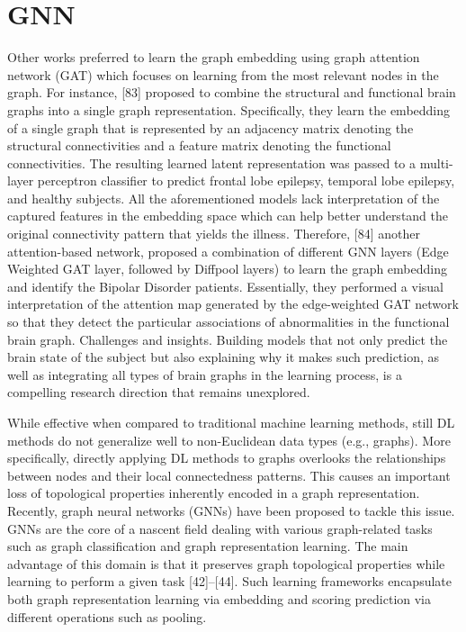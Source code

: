 \section{GNN}

Other
works preferred to learn the graph embedding using graph
attention network (GAT) which focuses on learning from
the most relevant nodes in the graph. For instance, [83]
proposed to combine the structural and functional brain
graphs into a single graph representation. Specifically, they
learn the embedding of a single graph that is represented by
an adjacency matrix denoting the structural connectivities
and a feature matrix denoting the functional connectivities.
The resulting learned latent representation was passed to
a multi-layer perceptron classifier to predict frontal lobe
epilepsy, temporal lobe epilepsy, and healthy subjects. All
the aforementioned models lack interpretation of the captured features in 
the embedding space which can help better
understand the original connectivity pattern that yields
the illness. Therefore, [84] another attention-based network,
proposed a combination of different GNN layers (Edge Weighted GAT layer, 
followed by Diffpool layers) to learn
the graph embedding and identify the Bipolar Disorder patients. Essentially, they performed a visual interpretation
of the attention map generated by the edge-weighted GAT
network so that they detect the particular associations of
abnormalities in the functional brain graph.
Challenges and insights. Building models that not only
predict the brain state of the subject but also explaining why
it makes such prediction, as well as integrating all types
of brain graphs in the learning process, is a compelling
research direction that remains unexplored.
\cite{Bessadok2022}


While effective when
compared to traditional machine learning methods, still
DL methods do not generalize well to non-Euclidean data
types (e.g., graphs). More specifically, directly applying DL
methods to graphs overlooks the relationships between
nodes and their local connectedness patterns. This causes an
important loss of topological properties inherently encoded
in a graph representation.
Recently, graph neural networks (GNNs) have been
proposed to tackle this issue. GNNs are the core of a
nascent field dealing with various graph-related tasks such
as graph classification and graph representation learning.
The main advantage of this domain is that it preserves graph topological properties 
while learning to perform a given task [42]–[44].
Such learning frameworks encapsulate both
graph representation learning via embedding and scoring
prediction via different operations such as pooling.

